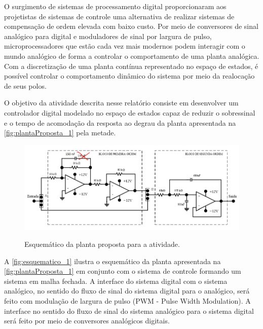 \documentclass[
	article,			%
	11pt,				%
	oneside,			%
	a4paper,			%
	english,			%
	brazil,				%
	sumario=tradicional
	]{abntex2}
\begin{document}
O surgimento de sistemas de processamento digital proporcionaram aos projetistas de sistemas de controle uma alternativa de realizar sistemas de compensação de ordem elevada com baixo custo. 
Por meio de conversores de sinal analógico para digital e moduladores de sinal por largura de pulso, microprocessadores que estão cada vez mais modernos podem interagir com o mundo analógico de forma a controlar o comportamento de uma planta analógica. 
Com a discretização de uma planta contínua representado no espaço de estados, é possível controlar o comportamento dinâmico do sistema por meio da realocação de seus polos.

O objetivo da atividade descrita nesse relatório consiste em desenvolver um controlador digital modelado no espaço de estados capaz de reduzir o sobressinal e o tempo de acomodação da resposta ao degrau da planta apresentada na \autoref{fig:plantaProposta_1} pela metade.



\begin{figure}[htb!]
	\centering
	\caption{Esquemático da planta proposta para a atividade.}
	\includegraphics[scale=0.5]{./img/plantaProposta.jpg}
	\label{fig:plantaProposta_1}
\end{figure}

A \autoref{fig:esquematico_1} ilustra o esquemático da planta apresentada na \autoref{fig:plantaProposta_1} em conjunto com o sistema de controle formando um sistema em malha fechada.
A interface do sistema digital com o sistema analógico, no sentido do fluxo de sinal do sistema digital para o analógico, será feito com modulação de largura de pulso (PWM - Pulse Width Modulation). 
A interface no sentido do fluxo de sinal do sistema analógico para o sistema digital será feito por meio de conversores analógicos digitais.
\end{document}
